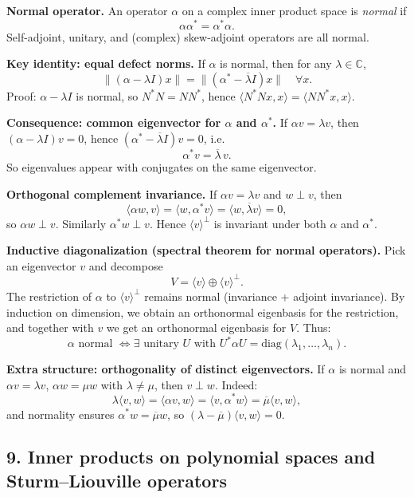 \documentclass[12pt,a4paper]{article}
\theoremstyle{plain}
\theoremstyle{definition}      %
\begin{document}
\textbf{Normal operator.}
An operator $\alpha$ on a complex inner product space is \emph{normal} if
\[
\alpha\alpha^*=\alpha^*\alpha.
\]
Self-adjoint, unitary, and (complex) skew-adjoint operators are all normal.

\textbf{Key identity: equal defect norms.}
If $\alpha$ is normal, then for any $\lambda\in\mathbb C$,
\[
\|(\alpha-\lambda I)x\|=\|(\alpha^*-\overline{\lambda}I)x\|\quad \forall x.
\]
Proof: $\alpha-\lambda I$ is normal, so $N^*N=NN^*$, hence $\langle N^*Nx,x\rangle=\langle NN^*x,x\rangle$.

\textbf{Consequence: common eigenvector for $\alpha$ and $\alpha^*$.}
If $\alpha v=\lambda v$, then $(\alpha-\lambda I)v=0$, hence $(\alpha^*-\overline\lambda I)v=0$, i.e.
\[
\alpha^*v=\overline\lambda\,v.
\]
So eigenvalues appear with conjugates on the same eigenvector.

\textbf{Orthogonal complement invariance.}
If $\alpha v=\lambda v$ and $w\perp v$, then
\[
\langle \alpha w,v\rangle=\langle w,\alpha^*v\rangle=\langle w,\overline\lambda v\rangle=0,
\]
so $\alpha w\perp v$. Similarly $\alpha^*w\perp v$.
Hence $\langle v\rangle^\perp$ is invariant under both $\alpha$ and $\alpha^*$.

\textbf{Inductive diagonalization (spectral theorem for normal operators).}
Pick an eigenvector $v$ and decompose
\[
V=\langle v\rangle \oplus \langle v\rangle^\perp.
\]
The restriction of $\alpha$ to $\langle v\rangle^\perp$ remains normal (invariance + adjoint invariance).
By induction on dimension, we obtain an orthonormal eigenbasis for the restriction, and together with $v$ we get an orthonormal eigenbasis for $V$.
Thus:
\[
\alpha \text{ normal } \iff \exists \text{ unitary }U\text{ with }U^*\alpha U=\mathrm{diag}(\lambda_1,\dots,\lambda_n).
\]

\textbf{Extra structure: orthogonality of distinct eigenvectors.}
If $\alpha$ is normal and $\alpha v=\lambda v$, $\alpha w=\mu w$ with $\lambda\neq \mu$, then $v\perp w$.
Indeed:
\[
\lambda \langle v,w\rangle=\langle \alpha v,w\rangle=\langle v,\alpha^* w\rangle=\overline{\mu}\langle v,w\rangle,
\]
and normality ensures $\alpha^*w=\overline\mu w$, so $(\lambda-\overline\mu)\langle v,w\rangle=0$.


\subsection*{9. Inner products on polynomial spaces and Sturm--Liouville operators}
\end{document}
